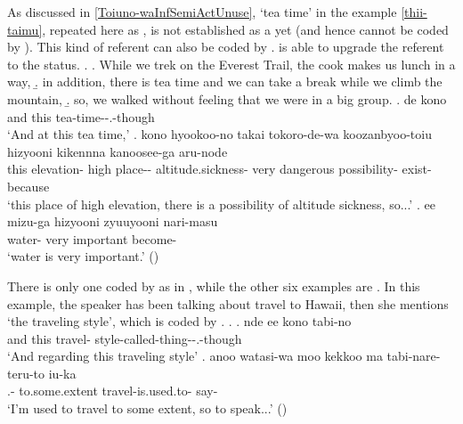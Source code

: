 As discussed in \ref{Toiuno-waInfSemiActUnuse},
`tea time' in the example \ref{thii-taimu}, repeated here as \Next, is not established as a  yet (and hence cannot be coded by ).
This kind of referent can also be coded by .
 is able to upgrade the referent to the  status.
%
\ex.\label{thii-taimu2}
 \a. While we trek on the Everest Trail, the cook makes us lunch in a way,
 \b. in addition, there is tea time and we can take a break while we climb the mountain,
 \b. so, we walked without feeling that we were in a big group.
 \bg. de kono  \\
		and this tea-time--.-though \\
		`And at this tea time,'
 \bg. kono hyookoo-no {takai} {tokoro-de-wa} koozanbyoo-toiu hizyooni {kikennna} {kanoosee-ga} aru-node \\
		this elevation- high place-- altitude.sickness- very dangerous possibility- exist-because \\
		`this place of high elevation, there is a possibility of altitude sickness, so...'
 \bg. ee {mizu-ga} hizyooni zyuuyooni nari-masu \\
		 water- very important become- \\
		`water is very important.'
		 \hfill{()}

There is only one  coded by  as in \Next,
while the other six examples are .
In this example,
the speaker has been talking about travel to Hawaii,
then she mentions `the traveling style',
which is coded by .
\ex. \ag. nde ee kono tabi-no  \\
		and  this travel- style-called-thing--.-though \\
		`And regarding this traveling style'
	\bg. anoo watasi-wa moo kekkoo ma tabi-nare-teru-to iu-ka \\
		 .-  to.some.extent  travel-is.used.to- say- \\
		`I'm used to travel to some extent, so to speak...'
		\hfill{()}
%

